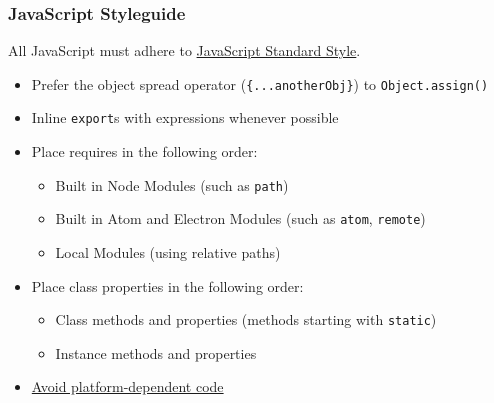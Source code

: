 \hypertarget{javascript-styleguide}{%
\subsubsection{JavaScript Styleguide}\label{javascript-styleguide}}

All JavaScript must adhere to \href{https://standardjs.com/}{JavaScript
Standard Style}.

\begin{itemize}
\item
  Prefer the object spread operator (\texttt{\{...anotherObj\}}) to
  \texttt{Object.assign()}
\item
  Inline \texttt{export}s with expressions whenever possible

\begin{Shaded}
\begin{Highlighting}[]
  \OperatorTok{\{}

\OperatorTok{\}}

\OperatorTok{\{}

\OperatorTok{\}}
 
\end{Highlighting}
\end{Shaded}
\item
  Place requires in the following order:

  \begin{itemize}
  \tightlist
  \item
    Built in Node Modules (such as \texttt{path})
  \item
    Built in Atom and Electron Modules (such as \texttt{atom},
    \texttt{remote})
  \item
    Local Modules (using relative paths)
  \end{itemize}
\item
  Place class properties in the following order:

  \begin{itemize}
  \tightlist
  \item
    Class methods and properties (methods starting with \texttt{static})
  \item
    Instance methods and properties
  \end{itemize}
\item
  \href{https://flight-manual.atom.io/hacking-atom/sections/cross-platform-compatibility/}{Avoid
  platform-dependent code}
\end{itemize}

